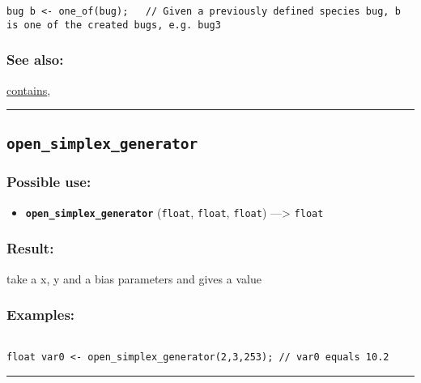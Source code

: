 \documentclass[]{book}
\providecommand{\tightlist}{%
  \setlength{\itemsep}{0pt}\setlength{\parskip}{0pt}}
\theoremstyle{definition}
\theoremstyle{definition}
\theoremstyle{definition}
\theoremstyle{remark}
\begin{document}
\begin{verbatim}
bug b <- one_of(bug);   // Given a previously defined species bug, b is one of the created bugs, e.g. bug3 
\end{verbatim}

\subsubsection{See also:}\label{see-also-151}

\href{OperatorsBC\#contains}{contains},

\begin{center}\rule{0.5\linewidth}{\linethickness}\end{center}

\subsection{\texorpdfstring{\texttt{open\_simplex\_generator}}{open\_simplex\_generator}}\label{open_simplex_generator}

\subsubsection{Possible use:}\label{possible-use-384}

\begin{itemize}
\tightlist
\item
  \textbf{\texttt{open\_simplex\_generator}} (\texttt{float},
  \texttt{float}, \texttt{float}) ---\textgreater{} \texttt{float}
\end{itemize}

\subsubsection{Result:}\label{result-370}

take a x, y and a bias parameters and gives a value

\subsubsection{Examples:}\label{examples-263}

\begin{verbatim}
 
float var0 <- open_simplex_generator(2,3,253); // var0 equals 10.2
\end{verbatim}

\begin{center}\rule{0.5\linewidth}{\linethickness}\end{center}
\end{document}
